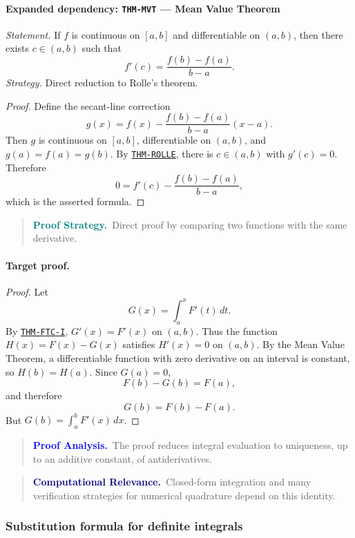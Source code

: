\documentclass[10pt]{article}
\newcommand{\pidraw}[1]{\begingroup\urlstyle{tt}\nolinkurl{#1}\endgroup}
\newcommand{\pidref}[1]{\hyperref[prf:#1]{\pidraw{#1}}}
\newcommand{\pid}[1]{\pidref{#1}}
\theoremstyle{definition}
\theoremstyle{remark}
\newenvironment{proofstrategy}
{\begin{quote}\small\noindent\textbf{\textcolor{teal}{Proof Strategy.}}\ }
{\end{quote}}
\newenvironment{proofanalysis}
{\begin{quote}\small\noindent\textbf{\textcolor{blue}{Proof Analysis.}}\ }
{\end{quote}}
\newenvironment{computationalrelevance}
{\begin{quote}\small\noindent\textbf{\textcolor{navy}{Computational Relevance.}}\ }
{\end{quote}}
\begin{document}
\paragraph{Expanded dependency: \pidraw{THM-MVT} --- Mean Value Theorem}
\textit{Statement.} If $f$ is continuous on $[a,b]$ and differentiable on $(a,b)$, then there exists $c\in(a,b)$ such that
\[
f'(c)=\frac{f(b)-f(a)}{b-a}.
\]
\textit{Strategy.} Direct reduction to Rolle's theorem.
\begin{proof}Define the secant-line correction
\[
g(x)=f(x)-\frac{f(b)-f(a)}{b-a}(x-a).
\]
Then $g$ is continuous on $[a,b]$, differentiable on $(a,b)$, and
$g(a)=f(a)=g(b)$. By \pid{THM-ROLLE}, there is $c\in(a,b)$ with $g'(c)=0$.
Therefore
\[
0=f'(c)-\frac{f(b)-f(a)}{b-a},
\]
which is the asserted formula.\end{proof}

\begin{proofstrategy}Direct proof by comparing two functions with the same derivative.\end{proofstrategy}

\paragraph{Target proof.}

\begin{proof}

Let
\[
G(x)=\int_a^x F'(t)\,dt.
\]
By \pid{THM-FTC-I}, $G'(x)=F'(x)$ on $(a,b)$. Thus the function
$H(x)=F(x)-G(x)$ satisfies $H'(x)=0$ on $(a,b)$. By the Mean Value Theorem,
a differentiable function with zero derivative on an interval is constant, so
$H(b)=H(a)$. Since $G(a)=0$,
\[
F(b)-G(b)=F(a),
\]
and therefore
\[
G(b)=F(b)-F(a).
\]
But $G(b)=\int_a^b F'(x)\,dx$.

\end{proof}

\begin{proofanalysis}The proof reduces integral evaluation to uniqueness, up to an additive constant, of antiderivatives.\end{proofanalysis}

\begin{computationalrelevance}Closed-form integration and many verification strategies for numerical quadrature depend on this identity.\end{computationalrelevance}

\subsubsection{Substitution formula for definite integrals}
\end{document}
